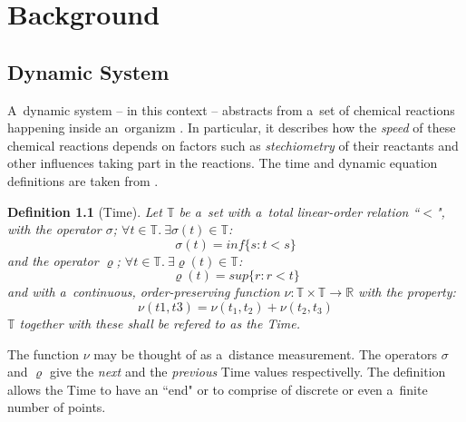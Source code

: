 \documentclass[12pt,oneside,draft]{fithesis}
\newcommand{\mReal}{\mathbb{R}}
\newcommand{\mTime}{\mathbb{T}}
\newtheorem{mydef}{Definition}
\begin{document}
\FrontMatter
\ThesisTitlePage

\begin{ThesisDeclaration}
\DeclarationText
\AdvisorName
\end{ThesisDeclaration}




\MainMatter
\tableofcontents
\chapter{Background}
\section{Dynamic System}
A~dynamic system -- in this context -- abstracts from
a~set of chemical reactions happening inside an~organizm \cite{sven}.
In particular, it describes how the \emph{speed} of these chemical
reactions depends on factors such as \emph{stechiometry} of their
reactants and other influences taking part in the reactions.
The time and dynamic equation definitions are taken from
\cite{pospisil}.
\begin{mydef}[Time]
Let $\mTime$ be a~set with a~total linear-order relation ``$<$",
with the operator $\sigma$; $\forall t \in \mTime{}.\:\exists
\sigma{}(t) \in \mTime$:
	\begin{equation}
		\sigma{}(t) = inf\{s : t < s\}
	\end{equation}
and the operator $\varrho$; $\forall t \in \mTime{}.\:\exists
\varrho{}(t) \in \mTime$:
	\begin{equation}
		\varrho{}(t) = sup\{r : r < t\}
	\end{equation}
and with a~continuous, order-preserving function
	$\nu: \mTime \times \mTime \rightarrow \mReal$
with the property:
	\begin{equation}
		\nu{}(t1, t3) = \nu{}(t_1, t_2) + \nu{}(t_2, t_3)
	\end{equation}
$\mTime$ together with these shall be refered to as the \emph{Time}.
\end{mydef}
The function $\nu$ may be thought of as a~distance measurement.
The operators $\sigma$ and $\varrho$ give the \emph{next} and the
\emph{previous}
Time values respectivelly. The definition allows the Time
to have an ``end" or to comprise of discrete or even
a~finite number of points.
\end{document}
